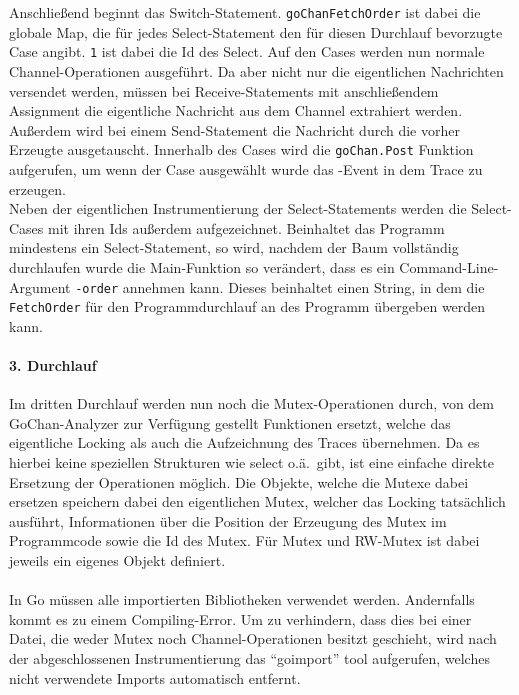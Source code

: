 Anschließend beginnt das Switch-Statement. \texttt{goChanFetchOrder} ist 
dabei die globale Map, die für jedes Select-Statement den für diesen 
Durchlauf bevorzugte Case angibt. \texttt{1} ist dabei die Id des 
Select. Auf den Cases werden nun normale 
Channel-Operationen ausgeführt. Da aber nicht nur die eigentlichen 
Nachrichten versendet werden, müssen bei Receive-Statements mit anschließendem 
Assignment die eigentliche Nachricht aus dem Channel extrahiert werden. Außerdem 
wird bei einem Send-Statement die Nachricht durch die vorher Erzeugte ausgetauscht.
Innerhalb des Cases wird die \texttt{goChan.Post} Funktion aufgerufen, um wenn 
der Case ausgewählt wurde das -Event in dem Trace zu erzeugen.\\
Neben der eigentlichen Instrumentierung der Select-Statements werden die Select-
Cases mit ihren Ids außerdem aufgezeichnet. Beinhaltet das Programm mindestens 
ein Select-Statement, so wird, nachdem der Baum vollständig durchlaufen wurde 
die Main-Funktion so verändert, dass es ein Command-Line-Argument \texttt{-order}
annehmen kann. Dieses beinhaltet einen String, in dem die \texttt{FetchOrder} für
den Programmdurchlauf an des Programm übergeben werden kann.
\paragraph{3. Durchlauf} Im dritten Durchlauf werden nun noch die Mutex-Operationen 
durch, von dem GoChan-Analyzer zur Verfügung gestellt Funktionen ersetzt, 
welche das eigentliche Locking als auch die Aufzeichnung des Traces übernehmen. 
Da es hierbei keine speziellen Strukturen wie select o.ä.\ gibt, ist eine 
einfache direkte Ersetzung der Operationen möglich. Die Objekte, welche die 
Mutexe dabei ersetzen speichern dabei den eigentlichen Mutex, welcher 
das Locking tatsächlich ausführt, Informationen über die Position der Erzeugung des 
Mutex im Programmcode sowie die Id des Mutex. Für Mutex und RW-Mutex 
ist dabei jeweils ein eigenes Objekt definiert.\\\\

In Go 
müssen alle importierten Bibliotheken verwendet werden. Andernfalls kommt es 
zu einem Compiling-Error. Um zu verhindern, dass dies bei einer Datei, die weder
Mutex noch Channel-Operationen besitzt geschieht, wird nach der abgeschlossenen 
Instrumentierung das ``goimport'' tool aufgerufen, welches nicht verwendete Imports 
automatisch entfernt.


